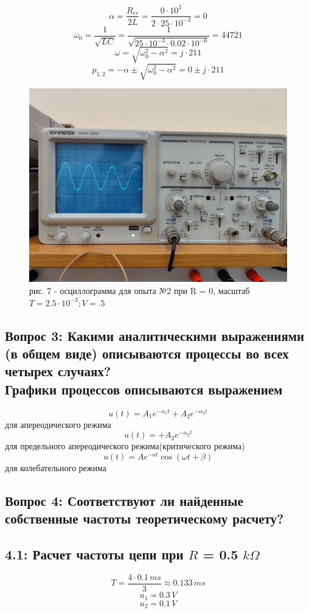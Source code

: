 \documentclass[a4paper,12pt]{report}
\begin{document}
\begin{flushleft}
\[ \alpha = \frac{R_{cr}}{2L} = \frac{0\cdot 10^3}{2\cdot 25\cdot 10^{-3}} = 0 \]
\[ \omega_0 = \frac{1}{\sqrt{LC}} = \frac{1}{\sqrt{25\cdot 10^{-3}\cdot 0.02\cdot 10^{-6}}} = 44721 \]
\[ \omega = \sqrt{\omega_0^2 - \alpha^2} = j \cdot 211 \]
\[ p_{1,2} = -\alpha \pm \sqrt{\omega_0^2 - \alpha^2} = 0 \pm j\cdot 211 \]
\begin{figure}[h!]
  \includegraphics[width=1\textwidth]{graph5.jpg}
  \label{ris:image7}
  рис. 7 - осциллограмма для опыта №2 при R = 0, масштаб $T = 2.5\cdot 10^{-3}; V = .5$
\end{figure}

  \newpage

  \subsection*{Вопрос 3: Какими аналитическими выражениями (в общем виде) описываются процессы во всех четырех случаях? \\Графики процессов описываются выражением}
  \[ u(t) = A_1e^{-\alpha_1 t} + A_2e^{-\alpha_2 t}\] для апереодического режима
  \[ u(t) =  + A_2e^{-\alpha_2 t}\] для предельного апереодического режима(критического режима)
  \[ u(t) = Ae^{-at}\cos(\omega t + \beta)\] для колебательного режима
	\subsection*{Вопрос 4: Соответствуют ли найденные собственные частоты теоретическому расчету?}
  \subsection*{4.1: Расчет частоты цепи при $R$ = 0.5 $k\Omega$}
  \[ T = \frac{4\cdot 0.1 \, ms}{3 } \approx 0.133 \, ms \]
  \[ u_1 = 0.3 \, V \]
  \[ u_2 = 0.1 \, V \]


\end{flushleft}
\end{document}
